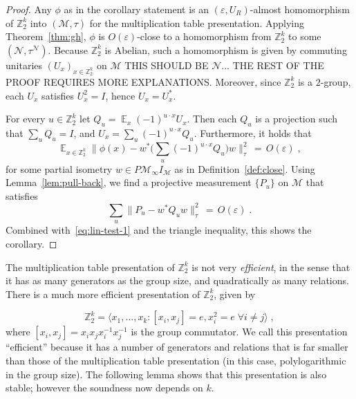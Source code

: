\documentclass[11pt]{article}
\theoremstyle{definition}
\newcommand{\Id}{\ensuremath{I}}
\DeclareMathOperator*{\Expectation}{\mathbb{E}}
\newcommand{\Es}[1]{\Expectation_{#1}}
\newcommand{\Z}{\ensuremath{\mathbb{Z}}}
\newcommand{\mM}{\ensuremath{\mathcal{M}}}
\newcommand{\eps}{\varepsilon}
\newcommand{\mN}{\mathcal{N}}
\begin{document}
\begin{proof}
Any $\phi$ as in the corollary statement is an $(\eps,U_R)$-almost homomorphism of $\Z_2^k$ into $(\mM,\tau)$ for the multiplication table presentation. Applying Theorem~\ref{thm:gh}, $\phi$ is $O(\eps)$-close to a homomorphism from $\Z_2^k$ to some $(\mN,\tau^\mN)$. Because $\Z_2^k$ is Abelian, such a homomorphism is given by commuting unitaries $(U_x)_{x\in\Z_2^k}$ on $\mM$ {\color{red} THIS SHOULD BE $\mN$... THE REST OF THE PROOF REQUIRES MORE EXPLANATIONS}. Moreover, since $\Z_2^k$ is a $2$-group, each $U_x$ satisfies $U_x^2=\Id$, hence $U_x=U_x^*$.

For every $u\in  \Z_2^k$ let $Q_u = \Es{x} (-1)^{u\cdot x} U_x$. Then each $Q_u$ is a projection such that $\sum_u Q_u=\Id$, and $U_x = \sum_u (-1)^{u\cdot x} Q_u$. Furthermore, it holds that 
\begin{equation}\label{eq:lin-test-1}
   \Es{x\in \Z_2^k} \Big\| \phi(x) - w^*\Big(\sum_u (-1)^{u\cdot x} Q_u\Big)w  \Big\|_{\tau}^2 \,=\, O(\eps)\;,
\end{equation}
for some partial isometry $w\in P\mM_\infty I_\mM$ as in Definition~\ref{def:close}.
Using Lemma~\ref{lem:pull-back}, we find a projective measurement $\{P_u\}$ on $\mM$ that satisfies 
\[ \sum_u \big\| P_u - w^* Q_u w \big\|_\tau^2 \,=\, O(\eps)\;.\]
Combined with~\eqref{eq:lin-test-1} and the triangle inequality, this shows the corollary. 
\end{proof}

The multiplication table presentation of $\Z_2^k$ is not very \emph{efficient}, in the sense that it has as many generators as the group size, and quadratically as many relations. There is a much more efficient presentation of $\Z_2^k$, given by

\begin{equation}\label{eq:z2-efficient}
 \Z_2^k = \langle x_1,\ldots,x_k : [x_i,x_j]=e, x_i^2=e \; \forall i\neq j \rangle\;,
\end{equation}
where $[x_i,x_j]=x_ix_jx_i^{-1}x_j^{-1}$ is the group commutator. 
We call this presentation ``efficient'' because it has a number of generators and relations that is far smaller than those of the multiplication table presentation (in this case, polylogarithmic in the group size). The following lemma shows that this presentation is also stable; however the soundness now depends on $k$. 
\end{document}
